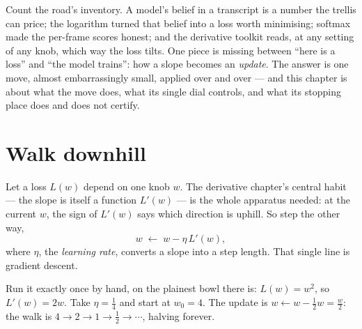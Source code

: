 \begin{narrative}
Count the road's inventory. A model's belief in a transcript is a
number the trellis can price; the logarithm turned that belief into a
loss worth minimising; softmax made the per-frame scores honest; and
the derivative toolkit reads, at any setting of any knob, which way the
loss tilts. One piece is missing between ``here is a loss'' and ``the
model trains'': how a slope becomes an \emph{update}. The answer is one
move, almost embarrassingly small, applied over and over — and this
chapter is about what the move does, what its single dial controls,
and what its stopping place does and does not certify.

\section{Walk downhill}

Let a loss $L(w)$ depend on one knob $w$. The derivative chapter's
central habit — the slope is itself a function $L'(w)$ — is the whole
apparatus needed: at the current $w$, the sign of $L'(w)$ says which
direction is uphill. So step the other way,
\[
  w \;\leftarrow\; w - \eta\, L'(w),
\]
where $\eta$, the \emph{learning rate}, converts a slope into a step
length. That single line is gradient descent.

Run it exactly once by hand, on the plainest bowl there is:
$L(w) = w^2$, so $L'(w) = 2w$. Take $\eta = \tfrac14$ and start at
$w_0 = 4$. The update is $w \leftarrow w - \tfrac12 w = \tfrac{w}{2}$:
the walk is $4 \to 2 \to 1 \to \tfrac12 \to \cdots$, halving forever.

\begin{center}
\end{center}


\end{narrative}
